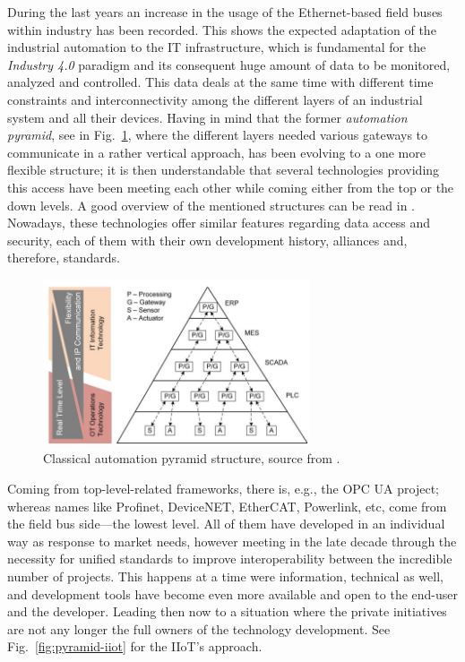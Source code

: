 During the last years an increase in the usage of the Ethernet-based field buses within industry has been recorded. This
shows the expected adaptation of the industrial automation to the IT infrastructure, which is fundamental for the \emph{Industry 4.0} paradigm
and its consequent huge amount of data to be monitored, analyzed and controlled. This data deals at the same time with different time constraints 
and interconnectivity among the different layers of an industrial system and all their devices. 
Having in mind that the former \emph{automation pyramid}, see in Fig.~\ref{fig:pyramid-classic}, where the different layers needed various gateways
to communicate in a rather vertical approach, has been evolving to a one more flexible structure; it is then understandable 
that several technologies providing this access have been meeting each other while coming either from the top or the down levels. A good 
overview of the mentioned structures can be read in \cite{tsn_intro}.
Nowadays, these technologies offer similar features regarding data access and security, each of them with their own development 
history, alliances and, therefore, standards. 
\begin{figure}[h]
    \centering
    \includegraphics[width=0.7\textwidth]{imgs/intro-industryarchitecture2.jpg}
    \caption{Classical automation pyramid structure, source from \cite{tsn_intro}.}
    \label{fig:pyramid-classic}
\end{figure}

Coming from top-level-related frameworks, there is, e.g., the OPC UA project; whereas names like Profinet,
DeviceNET, EtherCAT, Powerlink, etc, come from the field bus side---the lowest level. All of them have developed in an individual way as response
to market needs, however meeting in the late decade through the necessity for unified standards to improve interoperability between the incredible number
of projects. This happens at a time were information, technical as well, and development tools have become even more available and
open to the end-user and the developer. Leading then now to a situation where the private initiatives are not any longer the full owners of the technology development.
See Fig.~\ref{fig:pyramid-iiot} for the IIoT's approach.

